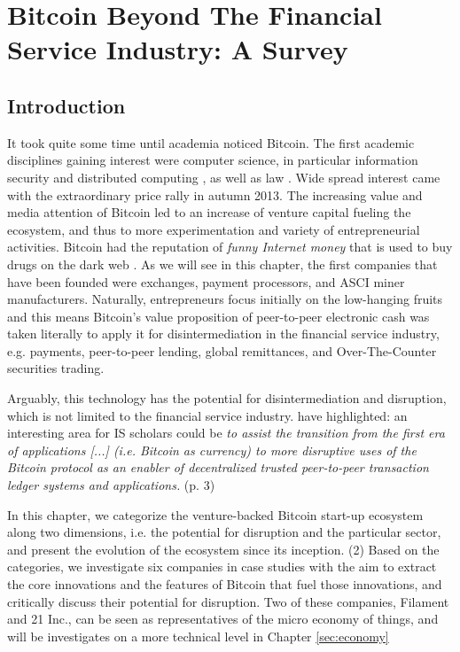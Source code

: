 \chapter{Bitcoin Beyond The Financial Service Industry: A Survey}
\label{sec:ecoystem}
\section{Introduction}


It took quite some time until academia noticed Bitcoin. The first academic disciplines gaining interest were computer science, in particular information security \parencite{Karame:2012:DFP:2382196.2382292,Barber2012} and distributed computing \parencite{Babaioff:2012:BRB:2229012.2229022}, as well as law \parencite{Grinberg2011,Ewing2012}. Wide spread interest came with the extraordinary price rally in autumn 2013. The increasing value and media attention of Bitcoin led to an increase of venture capital fueling the ecosystem, and thus to more experimentation and variety of entrepreneurial activities. Bitcoin had the reputation of \emph{funny Internet money} that is used to buy drugs on the dark web \parencite{Christin:2013:TSR:2488388.2488408}. As we will see in this chapter, the first companies that have been founded were exchanges, payment processors, and ASCI miner manufacturers.
Naturally, entrepreneurs focus initially on the low-hanging fruits and this means Bitcoin's value proposition of peer-to-peer electronic cash was taken literally to apply it for disintermediation in the financial service industry, e.g. payments, peer-to-peer lending, global remittances, and Over-The-Counter securities trading. 

Arguably, this technology has the potential for disintermediation and disruption, which is not limited to the financial service industry. \cite{Giaglis2014} have highlighted: an interesting area 
for IS scholars could be \emph{to assist the transition from the first era of applications 
[...] (i.e. Bitcoin as currency) to more disruptive uses of the Bitcoin protocol 
as an enabler of decentralized trusted peer-to-peer transaction ledger systems 
and applications.} (p. 3)

In this chapter, we categorize the venture-backed Bitcoin start-up 
ecosystem along two dimensions, i.e. the potential for disruption and the particular 
sector, and present the evolution of the ecosystem since its inception. (2) Based 
on the categories, we investigate six companies in case studies with the aim to 
extract the core innovations and the features of Bitcoin that fuel those innovations, 
and critically discuss their potential for disruption. Two of these companies, Filament and 21 Inc., can be seen as representatives of the micro economy of things, and will be investigates on a more technical level in Chapter \ref{sec:economy}

